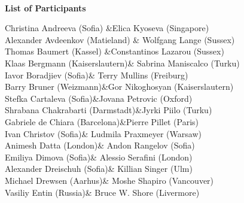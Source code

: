 \ \vspace{15mm}
\begin{center}{\Huge{\textbf{List of Participants}}}\\\end{center}

\begin{center}
\renewcommand{\tabcolsep}{4mm}
\btt[ll]

Christina Andreeva (Sofia) &Elica Kyoseva (Singapore)\\


Alexander Avdeenkov (Matieland) & Wolfgang Lange (Sussex)\\


Thomas Baumert (Kassel) &Constantinos Lazarou (Sussex)\\


Klaas Bergmann (Kaiserslautern)& Sabrina Maniscalco (Turku)\\


Iavor Boradjiev (Sofia)& Terry Mullins (Freiburg)\\


Barry Bruner (Weizmann)&Gor Nikoghosyan (Kaiserslautern)\\


Stefka Cartaleva (Sofia)&Jovana Petrovic (Oxford)\\


Shrabana Chakrabarti (Darmstadt)&Jyrki Piilo (Turku)\\


Gabriele de Chiara (Barcelona)&Pierre Pillet (Paris)\\


Ivan Christov (Sofia)& Ludmila Praxmeyer (Warsaw)\\


Animesh Datta (London)& Andon Rangelov (Sofia)\\


Emiliya Dimova (Sofia)& Alessio Serafini (London)\\


Alexander Dreischuh (Sofia)& Killian Singer (Ulm)\\


Michael Drewsen (Aarhus)& Moshe Shapiro (Vancouver)\\


Vasiliy Entin (Russia)& Bruce W. Shore (Livermore)\\



\end{center}
